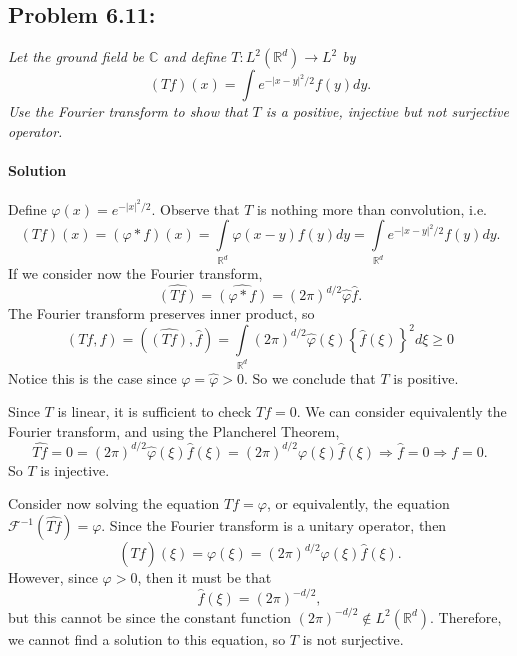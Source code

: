 \documentclass[letterpaper,twoside,11pt]{article}
\theoremstyle{mystyle}
\newcommand{\R}{{\mathbb R}}
\begin{document}
\newpage
\subsection*{Problem 6.11:}
\textit{Let the ground field be $\mathbb C$ and define $T: L^2\left( \R^d  \right) \to L^2$ by }
\[\left( Tf \right)(x) = \int e^{-|x-y|^2/2} f(y) dy.\]
\textit{Use the Fourier transform to show that $T$ is a positive, injective but not surjective operator. }
\paragraph*{Solution} 
Define $\varphi(x) = e^{-|x|^2/2}$. Observe that $T$ is nothing more than convolution, i.e. 
\[\left( {Tf} \right)\left( x \right) = \left( {\varphi  * f} \right)\left( x \right) = \int\limits_{{\mathbb{R}^d}} {\varphi \left( {x - y} \right)f\left( y \right)dy}  = \int\limits_{{\mathbb{R}^d}} {{e^{ - {{\left| {x - y} \right|}^2}/2}}f\left( y \right)dy} .\]
If we consider now the Fourier transform,
\[\widehat {\left( {Tf} \right)} = \widehat {\left( {\varphi  * f} \right)} = {\left( {2\pi } \right)^{d/2}}\hat \varphi \hat f.\]
The Fourier transform preserves inner product, so 
\[\left( {Tf,f} \right) = \left( {\widehat {\left( {Tf} \right)},\hat f} \right) = \int\limits_{{\mathbb{R}^d}} {{{\left( {2\pi } \right)}^{d/2}}\hat \varphi \left( \xi  \right){{\left\{ {\hat f\left( \xi  \right)} \right\}}^2}d\xi }  \geqslant 0\]
Notice this is the case since $\varphi = \hat \varphi >0$. So we conclude that $T$ is positive. 


Since $T$ is linear, it is sufficient to check $Tf=0$. We can consider equivalently the Fourier transform, and using the Plancherel Theorem,
\[\widehat {Tf} = 0 = {\left( {2\pi } \right)^{d/2}}\hat \varphi \left( \xi  \right)\hat f\left( \xi  \right) = {\left( {2\pi } \right)^{d/2}}\varphi \left( \xi  \right)\hat f\left( \xi  \right) \Rightarrow \hat f = 0 \Rightarrow f = 0.\]
So $T$ is injective. 

Consider now solving the equation $Tf = \varphi$, or equivalently, the equation ${\mathcal{F}^{ - 1}}\left( {\widehat {Tf}} \right) = \varphi $. Since the Fourier transform is a unitary operator, then 
\[\left( {\widehat {Tf}} \right)\left( \xi  \right) = \varphi \left( \xi  \right) = {\left( {2\pi } \right)^{d/2}}\varphi \left( \xi  \right)\hat f\left( \xi  \right).\]
However, since $\varphi > 0$, then it must be that \[\hat f\left( \xi  \right) = {\left( {2\pi } \right)^{ - d/2}},\]
but this cannot be since the constant function $\left( 2\pi \right)^{-d/2} \notin L^2\left( \R^d \right)$. Therefore, we cannot find a solution to this equation, so $T$ is not surjective. 
\end{document}
